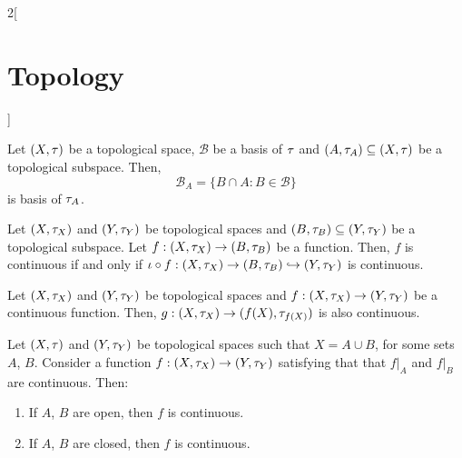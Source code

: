 \documentclass[../../../main.tex]{subfiles}
\begin{document}
\begin{multicols}{2}[\section{Topology}]
  \begin{prop}
    Let $(X,\tau)$ be a topological space, $\mathcal{B}$ be a basis of $\tau$ and $(A,\tau_A)\subseteq (X,\tau)$ be a topological subspace. Then, $$\mathcal{B}_A=\{B\cap A:B\in\mathcal{B}\}$$ is basis of $\tau_A$.
  \end{prop}
  \begin{prop}
    Let $(X,\tau_X)$ and $(Y,\tau_Y)$ be topological spaces and $(B,\tau_B)\subseteq (Y,\tau_Y)$ be a topological subspace. Let $f:(X,\tau_X)\rightarrow (B,\tau_B)$ be a function. Then, $f$ is continuous if and only if $\iota\circ f:(X,\tau_X)\rightarrow (B,\tau_B)\hookrightarrow (Y,\tau_Y)$ is continuous.
  \end{prop}
  \begin{corollary}
    Let $(X,\tau_X)$ and $(Y,\tau_Y)$ be topological spaces and $f:(X,\tau_X)\rightarrow (Y,\tau_Y)$ be a continuous function. Then, $g:(X,\tau_X)\rightarrow (f(X),\tau_{f(X)})$ is also continuous.
  \end{corollary}
  \begin{prop}
    Let $(X,\tau)$ and $(Y,\tau_Y)$ be topological spaces such that $X=A\cup B$, for some sets $A$, $B$. Consider a function $f:(X,\tau_X)\rightarrow (Y,\tau_Y)$ satisfying that that $f|_A$ and $f|_B$ are continuous. Then:
    \begin{enumerate}
      \item If $A$, $B$ are open, then $f$ is continuous.
      \item If $A$, $B$ are closed, then $f$ is continuous.
    \end{enumerate}
  \end{prop}

\end{multicols}
\end{document}
